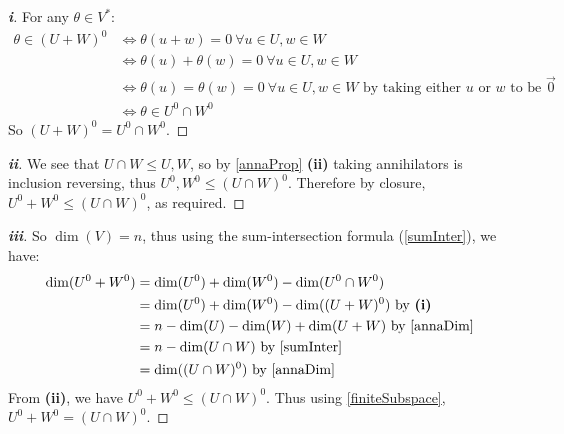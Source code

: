 \documentclass[../main.tex]{subfiles}
\begin{document}
\begin{proof}[\textbf{i}]
  For any $\theta \in V^{*}$:
  \begin{align*}
    \theta \in (U + W)^{0} &\iff \theta(u + w) = 0\ \forall u \in U, w \in W \\
                           &\iff \theta(u) + \theta(w) = 0\ \forall u \in U, w \in W \\
                           &\iff \theta(u) = \theta(w) = 0\ \forall u \in U, w \in W \text{ by taking either $u$ or $w$ to be $\vec{0}$} \\
                           &\iff \theta \in U^{0} \cap W^{0}
  \end{align*}
  So $(U + W)^{0} = U^{0} \cap W^{0}$.
\end{proof}
\begin{proof}[\textbf{ii}]
  We see that $U \cap W \leq U, W$, so by \cref{annaProp} \textbf{(ii)} taking annihilators is inclusion reversing, thus $U^{0}, W^{0} \leq (U \cap W)^{0}$.
  Therefore by closure, $U^{0} + W^{0} \leq (U \cap W)^{0}$, as required.
\end{proof}
\begin{proof}[\textbf{iii}]
  So $\dim(V) = n$, thus using the sum-intersection formula (\cref{sumInter}), we have:
  \begin{align*}
    \dim(U^{0} + W^{0}) &= \dim(U^{0}) + \dim(W^{0}) - \dim(U^{0} \cap W^{0}) \\
                        &= \dim(U^{0}) + \dim(W^{0}) - \dim((U + W)^{0}) \text{ by \textbf{(i)}} \\
                        &= n - \dim(U) - \dim(W) + \dim(U + W) \text{ by \cref{annaDim}} \\
                        &= n - \dim(U \cap W) \text{ by \cref{sumInter}} \\
                        &= \dim((U \cap W)^{0}) \text{ by \cref{annaDim}}
  \end{align*}
  From \textbf{(ii)}, we have $U^{0} + W^{0} \leq (U \cap W)^{0}$.
  Thus using \cref{finiteSubspace}, $U^{0} + W^{0} = (U \cap W)^{0}$.
\end{proof}
\end{document}
